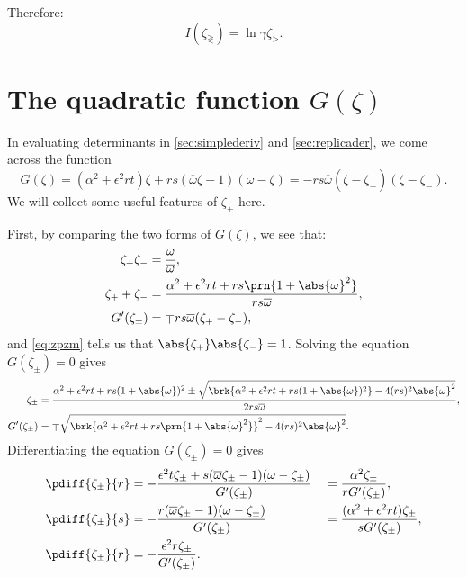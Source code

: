\documentclass[12pt]{article}
\newcommand{\omb}{\overline{\omega}}
\newcommand{\opo}{\prn{1+\abs{\omega}^2}}
\begin{document}
Therefore:
%
\begin{equation}\label{eq:countourintresult}
  I(\zeta_\gtrless) = \ln\gamma\zeta_>.
\end{equation}
%


\section{The quadratic function \texorpdfstring{$G(\zeta)$}{G(zeta)}}\label{sec:Gamma}

In evaluating determinants in \autoref{sec:simplederiv} and \autoref{sec:replicader}, we come across the function
%
\begin{equation}\label{eq:Gammadef}
  G(\zeta) = (\alpha^2+\epsilon^2rt)\zeta + rs(\omb\zeta-1)(\omega-\zeta) = - rs\omb (\zeta-\zeta_+) (\zeta-\zeta_-).
\end{equation}
%
We will collect some useful features of $\zeta_\pm$ here.

First, by comparing the two forms of $G(\zeta)$, we see that:
%
\begin{align}
\label{eq:zpzm}
  \zeta_+ \zeta_- &= \frac{\omega}{\omb},\\
  \label{eq:zppzm}
  \zeta_+ + \zeta_- &= \frac{\alpha^2+\epsilon^2rt + rs\opo}{rs\omb},\\
  \label{eq:Gprime}
  G'(\zeta_\pm) &= \mp rs\omb(\zeta_+ - \zeta_-),
\end{align}
%
and \eqref{eq:zpzm} tells us that $\abs{\zeta_+} \abs{\zeta_-}=1$.
Solving the equation $G(\zeta_\pm)=0$ gives
%
\begin{align}
\label{eq:zetapm}
  \zeta_\pm &= \frac{ \alpha^2+\epsilon^2rt + rs(1+\abs{\omega})^2
     \pm \sqrt{\brk{\alpha^2+\epsilon^2rt + rs(1+\abs{\omega})^2}
       - 4(rs)^2\abs{\omega}^2} }{2rs\omb},\\
\label{eq:Gprimesol}
  G'(\zeta_\pm) &= \mp\sqrt{\brk{\alpha^2+\epsilon^2rt + rs\opo}^2
       - 4(rs)^2\abs{\omega}^2}.
\end{align}
%
Differentiating the equation $G(\zeta_\pm)=0$ gives
%
\begin{equation}\label{eq:dzpmdrst}
\begin{aligned}
  \pdiff{\zeta_\pm}{r} &=
    -\frac{\epsilon^2t\zeta_\pm + s(\omb\zeta_\pm-1)(\omega-\zeta_\pm)}{G'(\zeta_\pm)}
    &&= \frac{\alpha^2\zeta_\pm}{rG'(\zeta_\pm)},\\
  \pdiff{\zeta_\pm}{s} &=
    -\frac{r(\omb\zeta_\pm-1)(\omega-\zeta_\pm)}{G'(\zeta_\pm)}
    &&= \frac{(\alpha^2+\epsilon^2rt)\zeta_\pm}{sG'(\zeta_\pm)},\\
  \pdiff{\zeta_\pm}{r} &=
    -\frac{\epsilon^2r\zeta_\pm}{G'(\zeta_\pm)}.
\end{aligned}
\end{equation}
%








\end{document}
